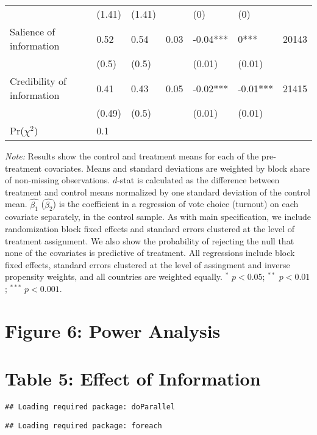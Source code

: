 \documentclass[]{article}
\begin{document}
\begin{table}[h!]
\begin{tabular}{lllllll}
   & (1.41) & (1.41) &  & (0) & (0) &  \\ 
  Salience of information & 0.52 & 0.54 & 0.03 & -0.04*** & 0*** & 20143 \\ 
   & (0.5) & (0.5) &  & (0.01) & (0.01) &  \\ 
  Credibility of information & 0.41 & 0.43 & 0.05 & -0.02*** & -0.01*** & 21415 \\ 
   & (0.49) & (0.5) &  & (0.01) & (0.01) &  \\ 
\hline Pr($\chi^2$) &0.1&&&&& \\ \hline\hline
\end{tabular}
\begin{flushleft}\textit{Note:} Results show the control and treatment means for each of the pre-treatment covariates. Means and standard deviations are weighted by block share of non-missing observations. $d$-stat is calculated as the difference between treatment and control means normalized by one standard deviation of the control mean. $\hat{\beta_1}$ ($\hat{\beta_2}$) is the coefficient in a regression of vote choice (turnout) on each covariate separately, in the control sample. As with main specification, we include randomization block fixed effects and standard errors clustered at the level of treatment assignment. We also show the probability of rejecting the null that none of the covariates is predictive of treatment. All regressions include block fixed effects, standard errors clustered at the level of assingment and inverse propensity weights, and all countries are weighted equally. $^*$ $p<0.05$; $^{**}$ $p<0.01$; $^{***}$ $p<0.001$. \end{flushleft}
\end{table}

\clearpage

\section{Figure 6: Power Analysis}\label{figure-6-power-analysis}

\section{Table 5: Effect of
Information}\label{table-5-effect-of-information}

\begin{verbatim}
## Loading required package: doParallel
\end{verbatim}

\begin{verbatim}
## Loading required package: foreach
\end{verbatim}
\end{document}
